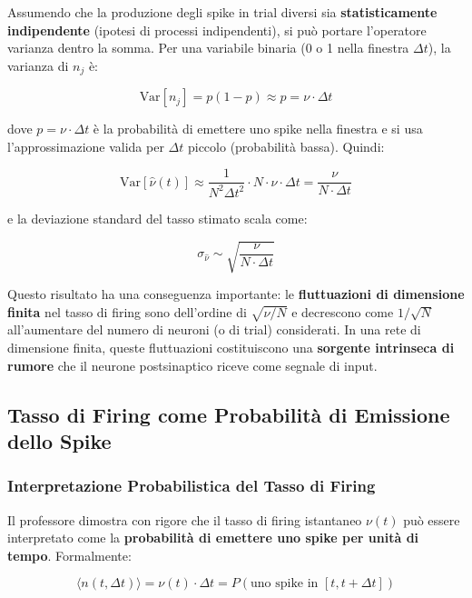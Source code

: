 Assumendo che la produzione degli spike in trial diversi sia \textbf{statisticamente indipendente} (ipotesi di processi indipendenti), si può portare l'operatore varianza dentro la somma. Per una variabile binaria (0 o 1 nella finestra $\Delta t$), la varianza di $n_j$ è:

\begin{equation}
\text{Var}[n_j] = p(1-p) \approx p = \nu \cdot \Delta t
\end{equation}

dove $p = \nu \cdot \Delta t$ è la probabilità di emettere uno spike nella finestra e si usa l'approssimazione valida per $\Delta t$ piccolo (probabilità bassa). Quindi:

\begin{equation}
\text{Var}\left[\hat{\nu}(t)\right] \approx \frac{1}{N^2 \Delta t^2} \cdot N \cdot \nu \cdot \Delta t = \frac{\nu}{N \cdot \Delta t}
\end{equation}

e la deviazione standard del tasso stimato scala come:

\begin{equation}
\sigma_{\hat{\nu}} \sim \sqrt{\frac{\nu}{N \cdot \Delta t}}
\end{equation}

Questo risultato ha una conseguenza importante: le \textbf{fluttuazioni di dimensione finita} nel tasso di firing sono dell'ordine di $\sqrt{\nu / N}$ e decrescono come $1/\sqrt{N}$ all'aumentare del numero di neuroni (o di trial) considerati. In una rete di dimensione finita, queste fluttuazioni costituiscono una \textbf{sorgente intrinseca di rumore} che il neurone postsinaptico riceve come segnale di input.



\subsection{Tasso di Firing come Probabilità di Emissione dello Spike}

\subsubsection{Interpretazione Probabilistica del Tasso di Firing}

Il professore dimostra con rigore che il tasso di firing istantaneo $\nu(t)$ può essere interpretato come la \textbf{probabilità di emettere uno spike per unità di tempo}. Formalmente:

\begin{equation}
\langle n(t, \Delta t) \rangle = \nu(t) \cdot \Delta t = P(\text{uno spike in } [t, t+\Delta t])
\end{equation}

